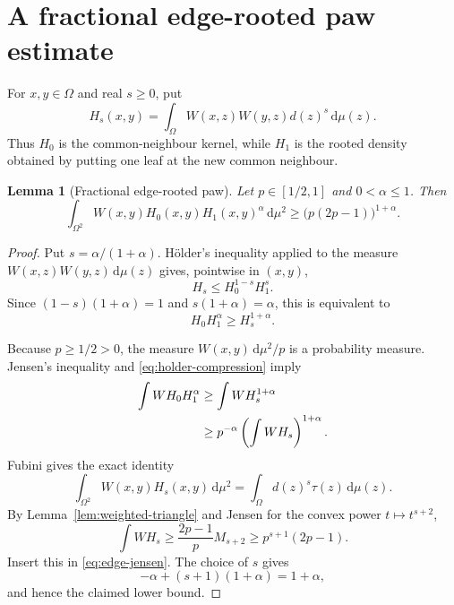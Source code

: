 \documentclass[11pt]{article}
\newtheorem{lemma}[theorem]{Lemma}
\newcommand{\dd}{\,\mathrm d}
\begin{document}
\section{A fractional edge-rooted paw estimate}

For $x,y\in\Omega$ and real $s\geq0$, put
\[
 H_s(x,y)=\int_\Omega W(x,z)W(y,z)d(z)^s\dd\mu(z).
\]
Thus $H_0$ is the common-neighbour kernel, while $H_1$ is the rooted
density obtained by putting one leaf at the new common neighbour.

\begin{lemma}[Fractional edge-rooted paw]
\label{lem:fractional-paw}
Let $p\in[1/2,1]$ and $0<\alpha\leq1$.  Then
\begin{equation}
 \int_{\Omega^2}W(x,y)H_0(x,y)H_1(x,y)^\alpha\dd\mu^2
 \geq \bigl(p(2p-1)\bigr)^{1+\alpha}.
 \label{eq:fractional-paw}
\end{equation}
\end{lemma}

\begin{proof}
Put $s=\alpha/(1+\alpha)$.  H\"older's inequality applied to the measure
$W(x,z)W(y,z)\dd\mu(z)$ gives, pointwise in $(x,y)$,
\[
 H_s\leq H_0^{1-s}H_1^s.
\]
Since $(1-s)(1+\alpha)=1$ and $s(1+\alpha)=\alpha$, this is equivalent to
\begin{equation}
 H_0H_1^\alpha\geq H_s^{1+\alpha}.
 \label{eq:holder-compression}
\end{equation}

Because $p\geq1/2>0$, the measure $W(x,y)\dd\mu^2/p$ is a probability
measure.  Jensen's inequality and \eqref{eq:holder-compression} imply
\begin{align}
 \int W H_0H_1^\alpha
 &\geq\int W H_s^{1+\alpha}\notag\\
 &\geq p^{-\alpha}\left(\int W H_s\right)^{1+\alpha}.
 \label{eq:edge-jensen}
\end{align}
Fubini gives the exact identity
\[
 \int_{\Omega^2}W(x,y)H_s(x,y)\dd\mu^2
 =\int_\Omega d(z)^s\tau(z)\dd\mu(z).
\]
By Lemma~\ref{lem:weighted-triangle} and Jensen for the convex power
$t\mapsto t^{s+2}$,
\[
 \int W H_s
 \geq\frac{2p-1}{p}M_{s+2}
 \geq p^{s+1}(2p-1).
\]
Insert this in \eqref{eq:edge-jensen}.  The choice of $s$ gives
\[
 -\alpha+(s+1)(1+\alpha)=1+\alpha,
\]
and hence the claimed lower bound.
\end{proof}


\end{document}
